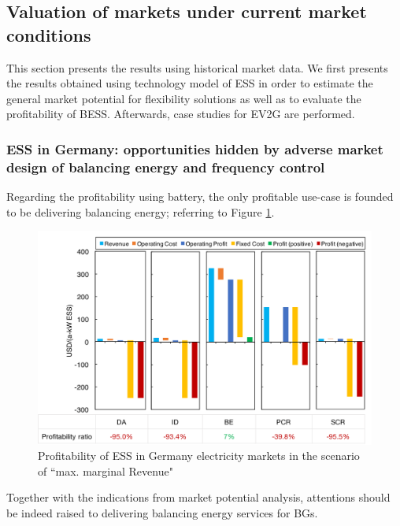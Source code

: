 \subsection{Valuation of markets under current market conditions}
This section presents the results using historical market data. We first presents the results obtained using technology model of ESS in order to estimate the general market potential for flexibility solutions as well as to evaluate the profitability of BESS. Afterwards, case studies for EV2G are performed.

\subsubsection{ESS in Germany: opportunities hidden by adverse market design of balancing energy and frequency control}


Regarding the profitability using battery, the only profitable use-case is founded to be delivering balancing energy; referring to Figure \ref{fig:germany-ess-profitability}.

\begin{figure}[h!]
	\centering
	\includegraphics[width=0.9\linewidth]{Figures/Germany_ESS_profitability}
	\caption{Profitability of ESS in Germany electricity markets in the scenario of ``max. marginal Revenue"}
	\label{fig:germany-ess-profitability}
\end{figure}

Together with the indications from market potential analysis, attentions should be indeed raised to
delivering balancing energy services for BGs. 